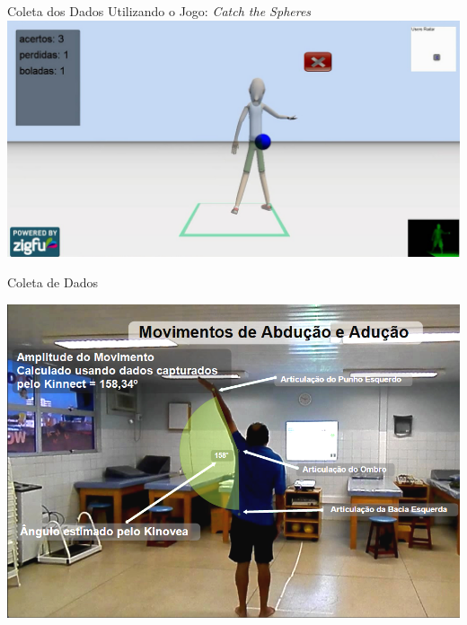 \documentclass{beamer}
\begin{document}
\begin{frame}{Coleta dos Dados Utilizando o Jogo: \textit{Catch the Spheres}}
      \center \includegraphics[height=2.2 in]{img/catch-the-spheres.png}
\end{frame}

\begin{frame}{Coleta de Dados}
  \begin{block}{}
  \center \includegraphics[height=2.4 in]{img/capturaducaokinnect.png} 
  \end{block}
\end{frame}
\end{document}
